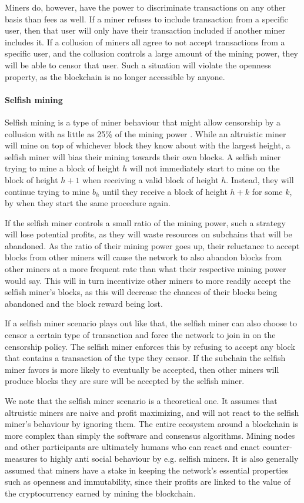 Miners do, however, have the power to discriminate transactions on any other basis than fees as well. If a miner refuses to include transaction from a specific user, then that user will only have their transaction included if another miner includes it. If a collusion of miners all agree to not accept transactions from a specific user, and the collusion controls a large amount of the mining power, they will be able to censor that user. Such a situation will violate the openness property, as the blockchain is no longer accessible by anyone. 

\paragraph{Selfish mining}
Selfish mining is a type of miner behaviour that might allow censorship by a collusion with as little as 25\% of the mining power \cite{eyal_majority_2018}. While an altruistic miner will mine on top of whichever block they know about with the largest height, a selfish miner will bias their mining towards their own blocks. A selfish miner trying to mine a block of height $h$ will not immediately start to mine on the block of height $h+1$ when receiving a valid block of height $h$. Instead, they will continue trying to mine $b_h$ until they receive a block of height $h+k$ for some $k$, by when they start the same procedure again.

If the selfish miner controls a small ratio of the mining power, such a strategy will lose potential profits, as they will waste resources on subchains that will be abandoned. As the ratio of their mining power goes up, their reluctance to accept blocks from other miners will cause the network to also abandon blocks from other miners at a more frequent rate than what their respective mining power would say. This will in turn incentivize other miners to more readily accept the selfish miner's blocks, as this will decrease the chances of their blocks being abandoned and the block reward being lost.

If a selfish miner scenario plays out like that, the selfish miner can also choose to censor a certain type of transaction and force the network to join in on the censorship policy. The selfish miner enforces this by refusing to accept any block that contains a transaction of the type they censor. If the subchain the selfish miner favors is more likely to eventually be accepted, then other miners will produce blocks they are sure will be accepted by the selfish miner.

We note that the selfish miner scenario is a theoretical one. It assumes that altruistic miners are naive and profit maximizing, and will not react to the selfish miner's behaviour by ignoring them. The entire ecosystem around a blockchain is more complex than simply the software and consensus algorithms. Mining nodes and other participants are ultimately humans who can react and enact counter-measures to highly anti social behaviour by e.g. selfish miners. It is also generally assumed that miners have a stake in keeping the network's essential properties such as openness and immutability, since their profits are linked to the value of the cryptocurrency earned by mining the blockchain.
